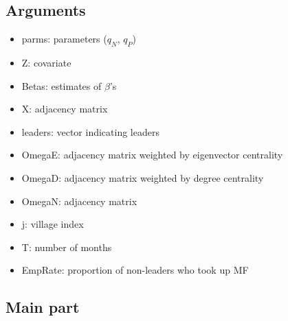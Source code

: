 \documentclass[10pt,letterpaper]{article}
\begin{document}
\subsection*{Arguments}
\begin{itemize}
  \item parms: parameters ($q_N$, $q_P$)
  \item Z: covariate
  \item Betas: estimates of $\beta$'s 
  \item X: adjacency matrix
  \item leaders: vector indicating leaders
  \item OmegaE: adjacency matrix weighted by eigenvector centrality
  \item OmegaD: adjacency matrix weighted by degree centrality
  \item OmegaN: adjacency matrix
  \item j: village index
  \item T: number of months
  \item EmpRate: proportion of non-leaders who took up MF
\end{itemize}

\subsection*{Main part}
\end{document}
